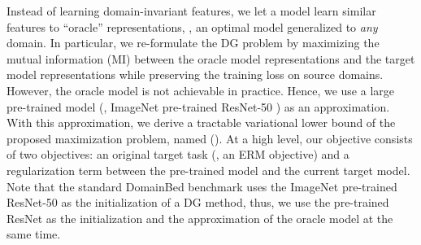 Instead of learning domain-invariant features, we let a model learn similar features to ``oracle'' representations, \ie, an optimal model generalized to \emph{any} domain. In particular, we re-formulate the DG problem by maximizing the mutual information (MI) between the oracle model representations and the target model representations while preserving the training loss on source domains. However, the oracle model is not achievable in practice. Hence, we use a large pre-trained model (\eg, ImageNet pre-trained ResNet-50 \cite{he2016_cvpr_resnet}) as an approximation. With this approximation, we derive a tractable variational lower bound of the proposed maximization problem, named \fullname{} (\method{}). At a high level, our \method{} objective consists of two objectives: an original target task (\ie, an ERM objective) and a regularization term between the pre-trained model and the current target model. Note that the standard DomainBed benchmark \cite{gulrajani2020domainbed} uses the ImageNet pre-trained ResNet-50 as the initialization of a DG method, thus, we use the pre-trained ResNet as the initialization and the approximation of the oracle model at the same time.

